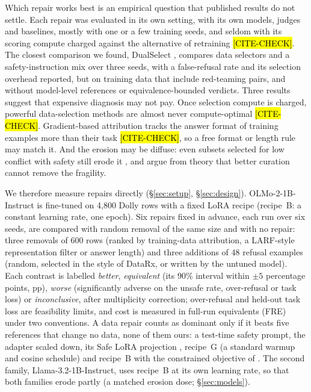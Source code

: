 \documentclass{article}
\theoremstyle{plain}
\theoremstyle{definition}
\theoremstyle{remark}
\newcommand{\ph}[1]{\hl{#1}}
\begin{document}
Which repair works best is an empirical question that published results do not
settle. Each repair was evaluated in its own setting, with its own models,
judges and baselines, mostly with one or a few training seeds, and seldom with
its scoring compute charged against the alternative of retraining
\ph{[CITE-CHECK]}. The closest comparison we found, DualSelect
\citep{chen2026dualselect}, compares data selectors and a safety-instruction
mix over three seeds, with a false-refusal rate and its selection overhead
reported, but on training data that include red-teaming pairs, and without
model-level references or equivalence-bounded verdicts. Three results suggest that expensive
diagnosis may not pay. Once selection compute is charged, powerful
data-selection methods are almost never compute-optimal
\citep{yin2025compute} \ph{[CITE-CHECK]}. Gradient-based attribution tracks the
answer format of training examples more than their task \citep{kim2026form}
\ph{[CITE-CHECK]}, so a free format or length rule may match it. And the
erosion may be diffuse: even subsets selected for low conflict with safety
still erode it \citep{guo2026safety}, and \citet{springer2026geometry} argue
from theory that better curation cannot remove the fragility.

We therefore measure repairs directly (\S\ref{sec:setup},
\S\ref{sec:design}). OLMo-2-1B-Instruct is fine-tuned on 4,800 Dolly rows with
a fixed LoRA recipe (recipe~B: a constant learning rate, one epoch). Six
repairs fixed in advance, each run over six seeds, are compared with random
removal of the same size and with no repair: three removals of 600 rows
(ranked by training-data attribution, a LARF-style representation filter or
answer length) and three additions of 48 refusal examples (random, selected in
the style of DataRx, or written by the untuned model). Each contrast is
labelled \emph{better}, \emph{equivalent} (its 90\% interval within $\pm 5$
percentage points, pp), \emph{worse} (significantly adverse on the unsafe
rate, over-refusal or task loss) or \emph{inconclusive}, after multiplicity
correction; over-refusal and held-out task loss are feasibility limits, and
cost is measured in full-run equivalents (FRE) under two conventions. A data
repair counts as dominant only if it beats five references that change no
data, none of them ours: a test-time safety prompt, the adapter scaled down,
its Safe LoRA projection \citep{hsu2024safelora}, recipe~G (a standard warmup
and cosine schedule) and recipe~B with the constrained objective of
\citet{qi2025shallow}. The second family, Llama-3.2-1B-Instruct, uses
recipe~B at its own learning rate, so that both families erode partly (a
matched erosion dose; \S\ref{sec:models}).
\end{document}

